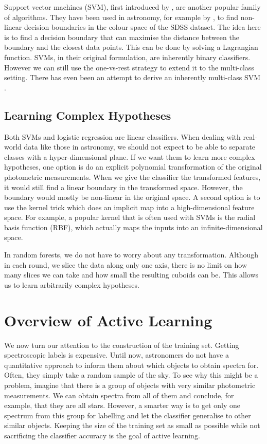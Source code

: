 Support vector machines (SVM), first introduced by , are another popular family of
algorithms. They have been used in astronomy, for example by , to find non-linear
decision boundaries in the colour space of the SDSS dataset. The idea here is to find a decision
boundary that can maximise the distance between the boundary and the closest data points. This can
be done by solving a Lagrangian function. SVMs, in their original formulation, are inherently binary
classifiers. However we can still use the one-vs-rest strategy to extend it to the multi-class
setting. There has even been an attempt to derive an inherently multi-class SVM \cite{crammer02}.

\subsection{Learning Complex Hypotheses}

Both SVMs and logistic regression are linear classifiers. When dealing with real-world data like
those in astronomy, we should not expect to be able to separate classes with a hyper-dimensional
plane. If we want them to learn more complex hypotheses, one option is do an explicit polynomial
transformation of the original photometric measurements. When we give the classifier the transformed
features, it would still find a linear boundary in the transformed space. However, the boundary
would mostly be non-linear in the original space. A second option is to use the kernel trick which
does an implicit map into a high-dimensional feature space. For example, a popular kernel that is
often used with SVMs is the radial basis function (RBF), which actually maps the inputs into an
infinite-dimensional space.

In random forests, we do not have to worry about any transformation. Although in each round, we
slice the data along only one axis, there is no limit on how many slices we can take and how small
the resulting cuboids can be. This allows us to learn arbitrarily complex hypotheses.

\section{Overview of Active Learning}

We now turn our attention to the construction of the training set. Getting spectroscopic labels is
expensive. Until now, astronomers do not have a quantitative approach to inform them about which
objects to obtain spectra for. Often, they simply take a random sample of the sky. To see why this
might be a problem, imagine that there is a group of objects with very similar photometric
measurements. We can obtain spectra from all of them and conclude, for example, that they are all
stars. However, a smarter way is to get only one spectrum from this group for labelling and let the
classifier generalise to other similar objects. Keeping the size of the training set as small as
possible while not sacrificing the classifier accuracy is the goal of active learning.

